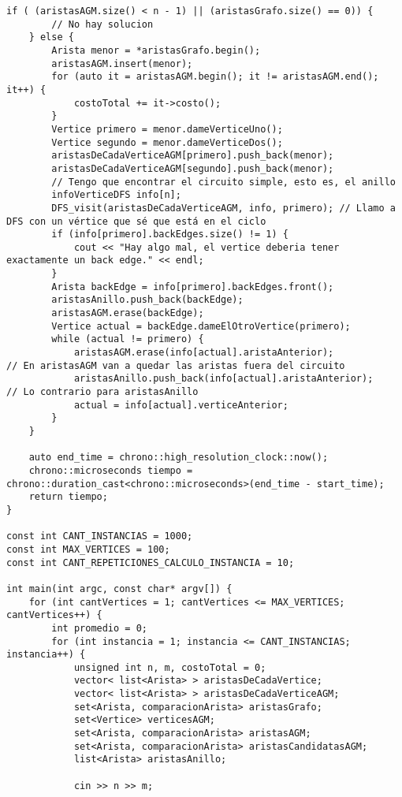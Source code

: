 \begin{lstlisting}[frame=single]
    if ( (aristasAGM.size() < n - 1) || (aristasGrafo.size() == 0)) {
        // No hay solucion
    } else {
        Arista menor = *aristasGrafo.begin();
        aristasAGM.insert(menor);
        for (auto it = aristasAGM.begin(); it != aristasAGM.end(); it++) {
            costoTotal += it->costo();
        }
        Vertice primero = menor.dameVerticeUno();
        Vertice segundo = menor.dameVerticeDos();
        aristasDeCadaVerticeAGM[primero].push_back(menor);
        aristasDeCadaVerticeAGM[segundo].push_back(menor);
        // Tengo que encontrar el circuito simple, esto es, el anillo
        infoVerticeDFS info[n];
        DFS_visit(aristasDeCadaVerticeAGM, info, primero); // Llamo a DFS con un vértice que sé que está en el ciclo
        if (info[primero].backEdges.size() != 1) {
            cout << "Hay algo mal, el vertice deberia tener exactamente un back edge." << endl;
        }
        Arista backEdge = info[primero].backEdges.front();
        aristasAnillo.push_back(backEdge);
        aristasAGM.erase(backEdge);
        Vertice actual = backEdge.dameElOtroVertice(primero);
        while (actual != primero) {
            aristasAGM.erase(info[actual].aristaAnterior);               // En aristasAGM van a quedar las aristas fuera del circuito
            aristasAnillo.push_back(info[actual].aristaAnterior);        // Lo contrario para aristasAnillo
            actual = info[actual].verticeAnterior;
        }
    }
    
    auto end_time = chrono::high_resolution_clock::now();
    chrono::microseconds tiempo = chrono::duration_cast<chrono::microseconds>(end_time - start_time);
    return tiempo;
}

const int CANT_INSTANCIAS = 1000;
const int MAX_VERTICES = 100;
const int CANT_REPETICIONES_CALCULO_INSTANCIA = 10;

int main(int argc, const char* argv[]) {
    for (int cantVertices = 1; cantVertices <= MAX_VERTICES; cantVertices++) {
        int promedio = 0;
        for (int instancia = 1; instancia <= CANT_INSTANCIAS; instancia++) {
            unsigned int n, m, costoTotal = 0;
            vector< list<Arista> > aristasDeCadaVertice;
            vector< list<Arista> > aristasDeCadaVerticeAGM;
            set<Arista, comparacionArista> aristasGrafo;
            set<Vertice> verticesAGM;
            set<Arista, comparacionArista> aristasAGM;
            set<Arista, comparacionArista> aristasCandidatasAGM;
            list<Arista> aristasAnillo;
            
            cin >> n >> m;
            

\end{lstlisting}
